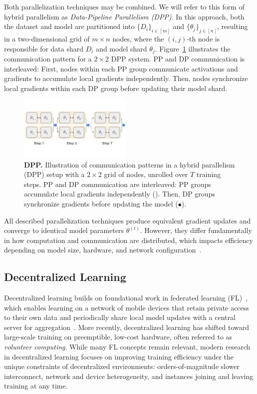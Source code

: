 \documentclass{article}
\newcommand{\orangebox}{\colorbox{oorange!50}{\hspace{0.3em}}}
\newcommand{\bluecircle}{\textcolor{bblue}{\LARGE$\bullet$}}
\begin{document}
Both parallelization techniques may be combined. We will refer to this form of hybrid parallelism as \textit{Data-Pipeline Parallelism (DPP)}. In this approach, both the dataset and model are partitioned into $\{D_i\}_{i \in [m]}$ and $\{\theta_j\}_{j \in [n]}$, resulting in a two-dimensional grid of $m \times n$ nodes, where the $(i,j)$-th node is responsible for data shard $D_i$ and model shard $\theta_j$. Figure~\ref{fig:dpp} illustrates the communication pattern for a $2\times 2$ DPP system. PP and DP communication is interleaved: First, nodes within each PP group communicate activations and gradients to accumulate local gradients independently. Then, nodes synchronize local gradients within each DP group before updating their model shard.

\begin{figure}[ht]
    \centering
    \vspace{0.5cm}
    \includegraphics[width=0.48\textwidth]{figures/dpp.pdf}
    \caption{\textbf{DPP.} Illustration of communication patterns in a hybrid parallelism (DPP) setup with a $2 \times 2$ grid of nodes, unrolled over $T$ training steps. PP and DP communication are interleaved: PP groups accumulate local gradients independently (\orangebox). Then, DP groups synchronize gradients before updating the model (\bluecircle).}
    \label{fig:dpp}
\end{figure}

All described parallelization techniques produce equivalent gradient updates and converge to identical model parameters $\theta^{(t)}$. However, they differ fundamentally in how computation and communication are distributed, which impacts efficiency depending on model size, hardware, and network configuration~\cite{hagemann2024parallelization, fernandez2024scalingtrends}.

\subsection{Decentralized Learning}

Decentralized learning builds on foundational work in federated learning (FL)~\cite{mcmahan2016fl}, which enables learning on a network
of mobile devices that retain private access to their own data and periodically share local model updates with a central server for aggregation~\cite{mcmahan2016fl,wang2020fedma}. More recently, decentralized learning has shifted toward large-scale training on preemptible, low-cost hardware, often referred to as \textit{volunteer computing}. While many FL concepts remain relevant, modern research in decentralized learning focuses on improving training efficiency under the unique constraints of decentralized environments: orders-of-magnitude slower interconnect, network and device heterogeneity, and instances joining and leaving training at any time.
\end{document}
